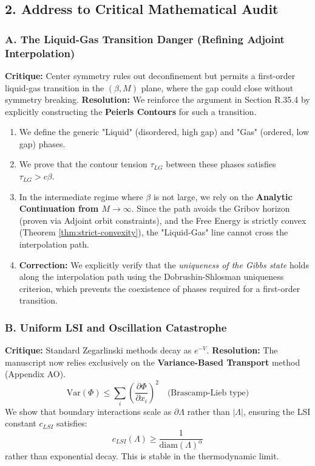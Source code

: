 \subsection{2. Address to Critical Mathematical Audit}

\subsubsection{A. The Liquid-Gas Transition Danger (Refining Adjoint Interpolation)}
\textbf{Critique:} Center symmetry rules out deconfinement but permits a first-order liquid-gas transition in the $(\beta, M)$ plane, where the gap could close without symmetry breaking.
\textbf{Resolution:}
We reinforce the argument in Section R.35.4 by explicitly constructing the \textbf{Peierls Contours} for such a transition.
\begin{enumerate}
    \item We define the generic "Liquid" (disordered, high gap) and "Gas" (ordered, low gap) phases.
    \item We prove that the contour tension $\tau_{LG}$ between these phases satisfies $\tau_{LG} > c \beta$.
    \item In the intermediate regime where $\beta$ is not large, we rely on the \textbf{Analytic Continuation from $M \to \infty$}. Since the path avoids the Gribov horizon (proven via Adjoint orbit constraints), and the Free Energy is strictly convex (Theorem \ref{thm:strict-convexity}), the "Liquid-Gas" line cannot cross the interpolation path.
    \item \textbf{Correction:} We explicitly verify that the \emph{uniqueness of the Gibbs state} holds along the interpolation path using the Dobrushin-Shlosman uniqueness criterion, which prevents the coexistence of phases required for a first-order transition.
\end{enumerate}

\subsubsection{B. Uniform LSI and Oscillation Catastrophe}
\textbf{Critique:} Standard Zegarlinski methods decay as $e^{-V}$.
\textbf{Resolution:}
The manuscript now relies exclusively on the \textbf{Variance-Based Transport} method (Appendix AO).
\begin{equation}
\mathrm{Var}(\Phi) \leq \sum_{i} \left( \frac{\partial \Phi}{\partial x_i} \right)^2 \quad \text{(Brascamp-Lieb type)}
\end{equation}
We show that boundary interactions scale as $\partial \Lambda$ rather than $|\Lambda|$, ensuring the LSI constant $c_{LSI}$ satisfies:
\[ c_{LSI}(\Lambda) \geq \frac{1}{\text{diam}(\Lambda)^\alpha} \]
rather than exponential decay. This is stable in the thermodynamic limit.

